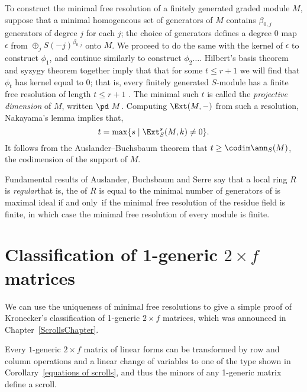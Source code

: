 To construct the minimal free resolution of a finitely generated graded module $M$, suppose that a minimal homogeneous set of generators
of $M$
contains $\beta_{0,j}$ generators of degree $j$ for each $j$; the choice of generators
defines a degree 0 map $\epsilon$
from
$
\oplus_jS(-j)^{\beta_{0,j}}
$
onto $M$. We proceed to do the same with the kernel of $\epsilon$ to construct $\phi_{1}$, and continue similarly to construct $\phi_{2}\dots$.
Hilbert's basis theorem
%
and
syzygy theorem
%
together imply that 
that for some $t\leq r+1$ we will find that $\phi_t$ has
kernel equal to 0; that is,
every finitely
generated $S$-module has a finite free resolution
of length $t\leq r+1$
\cite[Corollary 19.7]{Eisenbud1995}.
The minimal such $t$ is called the \emph{projective dimension} of $M$,
written $\pd\ M$.
%
%
Computing $\Ext(M,-)$ from such a resolution, Nakayama's lemma implies that,
$$
t = \max\{s \mid \Ext_S^s(M,k) \neq 0 \}.
$$
It follows from the Auslander--Buchsbaum
%
theorem \cite[Theorem 19.9]{Eisenbud1995} that $t \geq \codim \ann_S(M)$,
the codimension of the support of $M$.

\begin{fact}
 Fundamental
results of Auslander, Buchsbaum and Serre say that a local ring $R$
%
%
%
is \emph{regular}\emdash that is, the
%
%
of $R$ is equal to the
minimal number
of generators of is maximal ideal \emdash if and only~if the minimal free resolution
of the residue field is finite, in which case
the minimal free resolution of every module is finite.
\end{fact}
 



\section{Classification of 1-generic \texorpdfstring{$2\times f$}{2 x f}
matrices}\label{Kronecker}

We can use the uniqueness of minimal free resolutions to give a simple
proof of Kronecker's classification of 1-generic $2\times f$
%
matrices, which was announced in Chapter~\ref{ScrollsChapter}.

\begin{theorem}\label{matrix pencils}
Every
$1$-generic $2 \times f$ matrix of linear forms can be transformed by
row and column operations and a linear change
of variables to one of the type shown in
Corollary~\ref{equations of scrolls}, and thus the minors of any 1-generic
matrix define a scroll.
\unif
\end{theorem}

